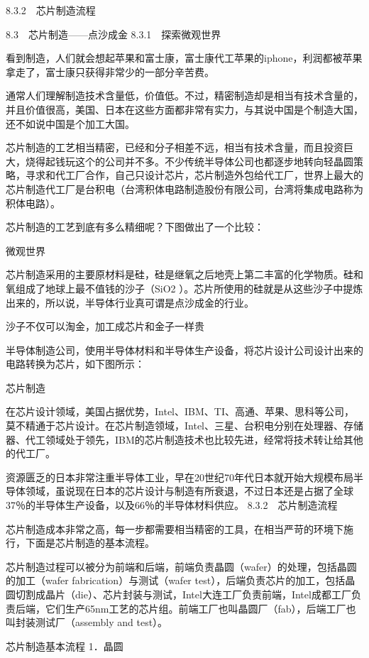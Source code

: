 \documentclass[12pt,UTF8]{ctexbook}
\begin{document}
8.3.2　芯片制造流程 



8.3　芯片制造——点沙成金
8.3.1　探索微观世界

看到制造，人们就会想起苹果和富士康，富士康代工苹果的iphone，利润都被苹果拿走了，富士康只获得非常少的一部分辛苦费。

通常人们理解制造技术含量低，价值低。不过，精密制造却是相当有技术含量的，并且价值很高，美国、日本在这些方面都非常有实力，与其说中国是个制造大国，还不如说中国是个加工大国。

芯片制造的工艺相当精密，已经和分子相差不远，相当有技术含量，而且投资巨大，烧得起钱玩这个的公司并不多。不少传统半导体公司也都逐步地转向轻晶圆策略，寻求和代工厂合作，自己只设计芯片，芯片制造外包给代工厂，世界上最大的芯片制造代工厂是台积电（台湾积体电路制造股份有限公司，台湾将集成电路称为积体电路）。

芯片制造的工艺到底有多么精细呢？下图做出了一个比较：

微观世界

芯片制造采用的主要原材料是硅，硅是继氧之后地壳上第二丰富的化学物质。硅和氧组成了地球上最不值钱的沙子（SiO2 ）。芯片所使用的硅就是从这些沙子中提炼出来的，所以说，半导体行业真可谓是点沙成金的行业。

沙子不仅可以淘金，加工成芯片和金子一样贵

半导体制造公司，使用半导体材料和半导体生产设备，将芯片设计公司设计出来的电路转换为芯片，如下图所示：

芯片制造

在芯片设计领域，美国占据优势，Intel、IBM、TI、高通、苹果、思科等公司，莫不精通于芯片设计。在芯片制造领域，Intel、三星、台积电分别在处理器、存储器、代工领域处于领先，IBM的芯片制造技术也比较先进，经常将技术转让给其他的代工厂。

资源匮乏的日本非常注重半导体工业，早在20世纪70年代日本就开始大规模布局半导体领域，虽说现在日本的芯片设计与制造有所衰退，不过日本还是占据了全球37％的半导体生产设备，以及66％的半导体材料供应。
8.3.2　芯片制造流程

芯片制造成本非常之高，每一步都需要相当精密的工具，在相当严苛的环境下施行，下面是芯片制造的基本流程。

芯片制造过程可以被分为前端和后端，前端负责晶圆（wafer）的处理，包括晶圆的加工（wafer fabrication）与测试（wafer test），后端负责芯片的加工，包括晶圆切割成晶片（die）、芯片封装与测试，Intel大连工厂负责前端，Intel成都工厂负责后端，它们生产65nm工艺的芯片组。前端工厂也叫晶圆厂（fab），后端工厂也叫封装测试厂（assembly and test）。

芯片制造基本流程
1．晶圆
\end{document}
